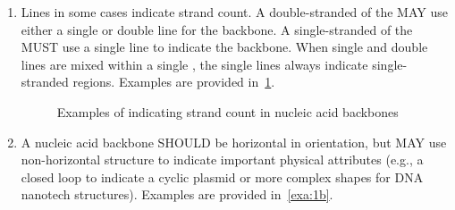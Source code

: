 \begin{enumerate}
\item Lines in some cases indicate strand count. 
	A double-stranded  of the  MAY use either a single or double line for the backbone.  
	A single-stranded  of the  MUST use a single line to indicate the backbone.
	When single and double lines are mixed within a single , the single lines always indicate single-stranded regions.
	Examples are provided in~\ref{exa:1a}.
	
	\begin{figure}[h!]
	\centering
	\caption{Examples of indicating strand count in nucleic acid backbones}
	\label{exa:1a}
	\end{figure}
		
\item A nucleic acid backbone SHOULD be horizontal in orientation, 
	but MAY use non-horizontal structure to indicate important physical attributes 
	(e.g., a closed loop to indicate a cyclic plasmid or more complex shapes for DNA nanotech structures).   
	Examples are provided in~\ref{exa:1b}.
	

\end{enumerate}
